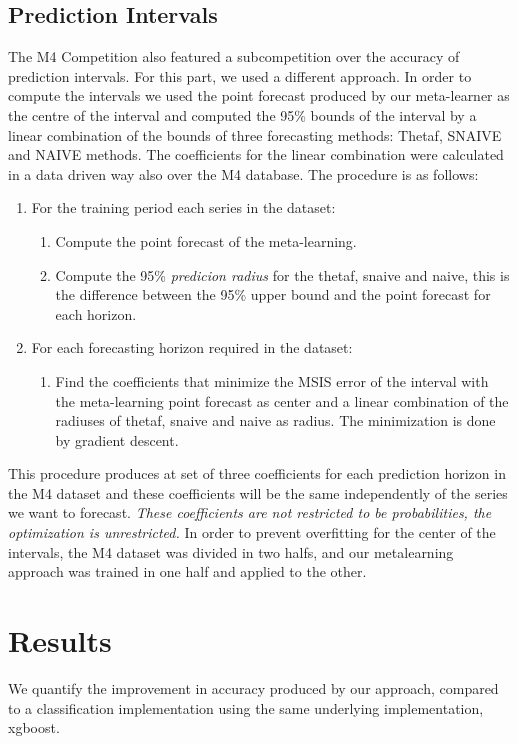 \documentclass[11pt,a4paper,]{article}
\providecommand{\tightlist}{%
  \setlength{\itemsep}{0pt}\setlength{\parskip}{0pt}}
\theoremstyle{definition}
\theoremstyle{definition}
\theoremstyle{definition}
\theoremstyle{remark}
\begin{document}
\subsection{Prediction Intervals}\label{prediction-intervals}

The M4 Competition also featured a subcompetition over the accuracy of
prediction intervals. For this part, we used a different approach. In
order to compute the intervals we used the point forecast produced by
our meta-learner as the centre of the interval and computed the 95\%
bounds of the interval by a linear combination of the bounds of three
forecasting methods: Thetaf, SNAIVE and NAIVE methods. The coefficients
for the linear combination were calculated in a data driven way also
over the M4 database. The procedure is as follows:

\begin{enumerate}
\def\labelenumi{\arabic{enumi}.}
\tightlist
\item
  For the training period each series in the dataset:

  \begin{enumerate}
  \def\labelenumii{\arabic{enumii}.}
  \tightlist
  \item
    Compute the point forecast of the meta-learning.
  \item
    Compute the 95\% \emph{predicion radius} for the thetaf, snaive and
    naive, this is the difference between the 95\% upper bound and the
    point forecast for each horizon.
  \end{enumerate}
\item
  For each forecasting horizon required in the dataset:

  \begin{enumerate}
  \def\labelenumii{\arabic{enumii}.}
  \tightlist
  \item
    Find the coefficients that minimize the MSIS error of the interval
    with the meta-learning point forecast as center and a linear
    combination of the radiuses of thetaf, snaive and naive as radius.
    The minimization is done by gradient descent.
  \end{enumerate}
\end{enumerate}

This procedure produces at set of three coefficients for each prediction
horizon in the M4 dataset and these coefficients will be the same
independently of the series we want to forecast. \emph{These
coefficients are not restricted to be probabilities, the optimization is
unrestricted.} In order to prevent overfitting for the center of the
intervals, the M4 dataset was divided in two halfs, and our metalearning
approach was trained in one half and applied to the other.

\section{Results}\label{results}

We quantify the improvement in accuracy produced by our approach,
compared to a classification implementation using the same underlying
implementation, xgboost.

\printbibliography[title=References]
\end{document}
